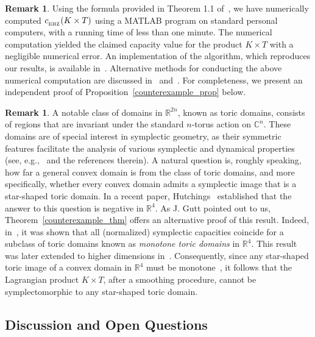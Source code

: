 \documentclass[10pt,a4paper]{article}
\theoremstyle{definition}
\newtheorem{remark}[theorem]{Remark}
\newcommand{\ehzcap}{c_{_{\rm EHZ}}}
\begin{document}
\begin{remark}
Using the formula provided in Theorem 1.1 of~\cite{pazit}, we have numerically computed  $\ehzcap( K \times T)$ using a MATLAB  program on standard personal computers, with a running time of less than one minute. 
The numerical computation yielded the claimed capacity value for the product $K \times T$ with a negligible numerical error. An  implementation of the algorithm, which reproduces our results, is available in~\cite{pazit-website}. Alternative methods for conducting the above numerical computation are discussed in~\cite{Ch-H} and~\cite{R-K}. For completeness, we  present an independent proof of Proposition~\ref{counterexample_prop} below.
\end{remark}



\begin{remark}
A notable class of domains in \(\mathbb{R}^{2n}\), known as toric domains, consists of regions that are invariant under the standard \(n\)-torus action on \(\mathbb{C}^n\). These domains are of special interest in symplectic geometry, as their symmetric features facilitate the analysis of various symplectic and dynamical properties (see, e.g.,~\cite{Gu-Ha,gutt-hutchings-ramos,C-CG-F-H-R,CG} and the references therein). 
A natural question is, roughly speaking, how far a general convex domain is from the class of toric domains, and more specifically, whether every convex domain admits a symplectic image that is a star-shaped toric domain.  
In a recent paper, Hutchings~\cite{Hut24} established that the answer to this question is negative in \(\mathbb{R}^4\). As J. Gutt pointed out to us, Theorem~\ref{counterexample_thm} offers an alternative proof of this result.
Indeed, in~\cite{gutt-hutchings-ramos}, it was shown that all (normalized) symplectic capacities coincide for a subclass of toric domains known as \textit{monotone toric domains} in \(\mathbb{R}^4\). This result was later extended to higher dimensions in~\cite{CG-H}.  
Consequently, since any star-shaped toric image of a convex domain in \(\mathbb{R}^4\) must be monotone~\cite[Proposition 1.8]{gutt-hutchings-ramos}, it follows that the Lagrangian product \(K \times T\),  after a smoothing procedure, cannot be symplectomorphic to any star-shaped toric domain.
\end{remark}


\subsection{ Discussion and Open Questions} 
\end{document}
